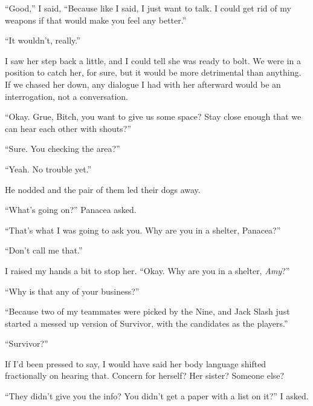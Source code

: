``Good,'' I said, ``Because like I said, I just want to talk.  I could get rid of my weapons if that would make you feel any better.''



``It wouldn't, really.''



I saw her step back a little, and I could tell she was ready to bolt.  We were in a position to catch her, for sure, but it would be more detrimental than anything.  If we chased her down, any dialogue I had with her afterward would be an interrogation, not a conversation.



``Okay.  Grue, Bitch, you want to give us some space?  Stay close enough that we can hear each other with shouts?''



``Sure.  You checking the area?''



``Yeah.  No trouble yet.''



He nodded and the pair of them led their dogs away.



``What's going on?'' Panacea asked.



``That's what I was going to ask you.  Why are you in a shelter, Panacea?''



``Don't call me that.''



I raised my hands a bit to stop her.  ``Okay.  Why are you in a shelter, \emph{Amy}?''



``Why is that any of your business?''



``Because two of my teammates were picked by the Nine, and Jack Slash just started a messed up version of Survivor, with the candidates as the players.''



``Survivor?''



If I'd been pressed to say, I would have said her body language shifted fractionally on hearing that.  Concern for herself?  Her sister?  Someone else?



``They didn't give you the info?  You didn't get a paper with a list on it?''  I asked.



